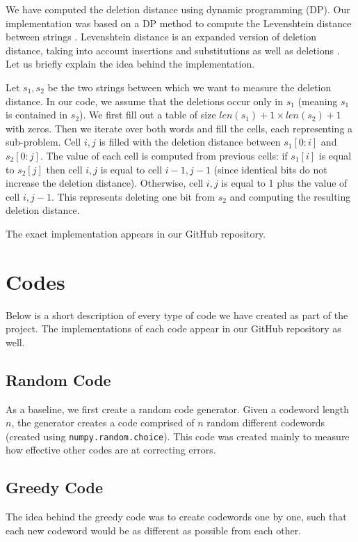 \documentclass{article}
\begin{document}
We have computed the deletion distance using dynamic programming (DP). Our implementation was based on a DP method to compute the Levenshtein distance between strings \cite{DP}. Levenshtein distance is an expanded version of deletion distance, taking into account insertions and substitutions as well as deletions \cite{Levenshtein}.
Let us briefly explain the idea behind the implementation.

Let $s_1, s_2$ be the two strings between which we want to measure the deletion distance. In our code, we assume that the deletions occur only in $s_1$ (meaning $s_1$ is contained in $s_2$). We first fill out a table of size $len(s_1)+1 \times len(s_2)+1$ with zeros. Then we iterate over both words and fill the cells, each representing a sub-problem. Cell $i,j$ is filled with the deletion distance between $s_1[0:i]$ and $s_2[0:j]$. The value of each cell is computed from previous cells: if $s_1[i]$ is equal to $s_2[j]$ then cell $i, j$ is equal to cell $i-1, j-1$ (since identical bits do not increase the deletion distance). Otherwise, cell $i, j$ is equal to 1 plus the value of cell $i, j-1$. This represents deleting one bit from $s_2$ and computing the resulting deletion distance.

The exact implementation appears in our GitHub repository.


\section{Codes}
Below is a short description of every type of code we have created as part of the project. The implementations of each code appear in our GitHub repository as well.

\subsection{Random Code}

As a baseline, we first create a random code generator. Given a codeword length $n$, the generator creates a code comprised of $n$ random different codewords (created using \texttt{numpy.random.choice}). This code was created mainly to measure how effective other codes are at correcting errors.

\subsection{Greedy Code}

The idea behind the greedy code was to create codewords one by one, such that each new codeword would be as different as possible from each other.
\end{document}
